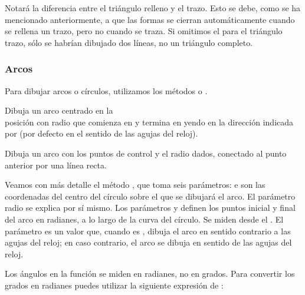 Notará la diferencia entre el triángulo relleno y el trazo. Esto se debe, como se ha mencionado anteriormente, a que las formas se cierran automáticamente cuando se rellena un trazo, pero no cuando se traza. Si omitimos el  para el triángulo trazo, sólo se habrían dibujado dos líneas, no un triángulo completo.

\newpage %
\subsubsection{Arcos}

Para dibujar arcos o círculos, utilizamos los métodos  o .

\begin{description}
	 Dibuja un arco centrado en la \\ posición  con radio  que comienza en  y termina en  yendo en la dirección indicada por  (por defecto en el sentido de las agujas del reloj).

	 Dibuja un arco con los puntos de control y el radio dados, conectado al punto anterior por una línea recta.
\end{description}
\vspace{0.5cm} %

Veamos con más detalle el método , que toma seis parámetros:  e  son las coordenadas del centro del círculo sobre el que se dibujará el arco. El parámetro radio se explica por sí mismo. Los parámetros  y  definen los puntos inicial y final del arco en radianes, a lo largo de la curva del círculo. Se miden desde el . El parámetro  es un valor  que, cuando es , dibuja el arco en sentido contrario a las agujas del reloj; en caso contrario, el arco se dibuja en sentido de las agujas del reloj.

\vspace{0.5cm} %
\begin{tcolorbox}
	[colback=red!5!white,colframe=cyan,fonttitle=\bfseries,title={\faLightbulbO\, Nota:}]

	Los ángulos en la función  se miden en radianes, no en grados. Para convertir los grados en radianes puedes utilizar la siguiente expresión de :

	\vspace{0.5cm} %
	\begin{center}
	\end{center}
\end{tcolorbox}
\vspace{0.5cm} %

